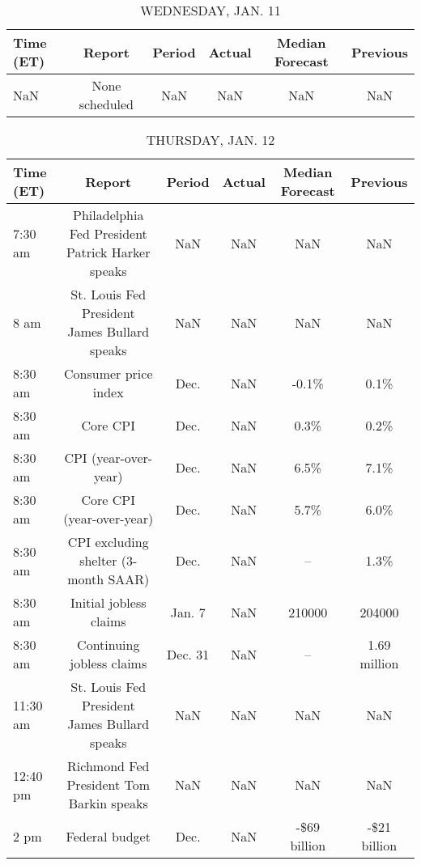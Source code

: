 \documentclass{article}%
\begin{document}
%


\begin{table}[htbp]%
\caption{WEDNESDAY, JAN. 11}%
\centering%
\begin{adjustbox}{width=1\textwidth}%
\begin{tabular}{lccccc}
\toprule
Time (ET) &         Report & Period & Actual & Median Forecast & Previous \\
\midrule
      NaN & None scheduled &    NaN &    NaN &             NaN &      NaN \\
\bottomrule
\end{tabular}
%
\end{adjustbox}%
\end{table}

%


\begin{table}[htbp]%
\caption{THURSDAY, JAN. 12}%
\centering%
\begin{adjustbox}{width=1\textwidth}%
\begin{tabular}{lccccc}
\toprule
Time (ET) &                                           Report &  Period & Actual & Median Forecast &     Previous \\
\midrule
  7:30 am & Philadelphia Fed President Patrick Harker speaks &     NaN &    NaN &             NaN &          NaN \\
     8 am &     St. Louis Fed President James Bullard speaks &     NaN &    NaN &             NaN &          NaN \\
  8:30 am &                             Consumer price index &    Dec. &    NaN &           -0.1\% &         0.1\% \\
  8:30 am &                                         Core CPI &    Dec. &    NaN &            0.3\% &         0.2\% \\
  8:30 am &                             CPI (year-over-year) &    Dec. &    NaN &            6.5\% &         7.1\% \\
  8:30 am &                        Core CPI (year-over-year) &    Dec. &    NaN &            5.7\% &         6.0\% \\
  8:30 am &             CPI excluding shelter (3-month SAAR) &    Dec. &    NaN &              -- &         1.3\% \\
  8:30 am &                           Initial jobless claims &  Jan. 7 &    NaN &          210000 &       204000 \\
  8:30 am &                        Continuing jobless claims & Dec. 31 &    NaN &              -- & 1.69 million \\
 11:30 am &     St. Louis Fed President James Bullard speaks &     NaN &    NaN &             NaN &          NaN \\
 12:40 pm &         Richmond Fed President Tom Barkin speaks &     NaN &    NaN &             NaN &          NaN \\
     2 pm &                                   Federal budget &    Dec. &    NaN &    -\$69 billion & -\$21 billion \\
\bottomrule
\end{tabular}
%
\end{adjustbox}%
\end{table}
\end{document}
